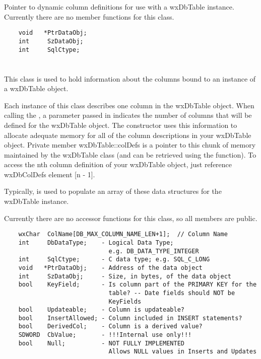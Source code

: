 

\section{}\label{wxdbcoldataptr}

Pointer to dynamic column definitions for use with a wxDbTable instance.  
Currently there are no member functions for this class.

\begin{verbatim}
    void   *PtrDataObj;
    int     SzDataObj;
    int     SqlCtype;
\end{verbatim}


\section{}\label{wxdbcoldef}

This class is used to hold information about the columns bound to an 
instance of a wxDbTable object.  

Each instance of this class describes one column in the wxDbTable 
object.  When calling the , a 
parameter passed in indicates the number of columns that will be defined for 
the wxDbTable object.  The constructor uses this information to allocate 
adequate memory for all of the column descriptions in your wxDbTable object.  
Private member wxDbTable::colDefs is a pointer to this chunk of memory 
maintained by the wxDbTable class (and can be retrieved using the 
 function).  
To access the nth column definition of your wxDbTable object, just reference 
wxDbColDefs element [n - 1].

Typically,  is used to 
populate an array of these data structures for the wxDbTable instance.

Currently there are no accessor functions for this class, so all members are 
public.

\begin{verbatim}
    wxChar  ColName[DB_MAX_COLUMN_NAME_LEN+1];  // Column Name
    int     DbDataType;    - Logical Data Type; 
                             e.g. DB_DATA_TYPE_INTEGER
    int     SqlCtype;      - C data type; e.g. SQL_C_LONG
    void   *PtrDataObj;    - Address of the data object
    int     SzDataObj;     - Size, in bytes, of the data object
    bool    KeyField;      - Is column part of the PRIMARY KEY for the
                             table? -- Date fields should NOT be 
                             KeyFields
    bool    Updateable;    - Column is updateable?
    bool    InsertAllowed; - Column included in INSERT statements?
    bool    DerivedCol;    - Column is a derived value?
    SDWORD  CbValue;       - !!!Internal use only!!!
    bool    Null;          - NOT FULLY IMPLEMENTED
                             Allows NULL values in Inserts and Updates
\end{verbatim}

